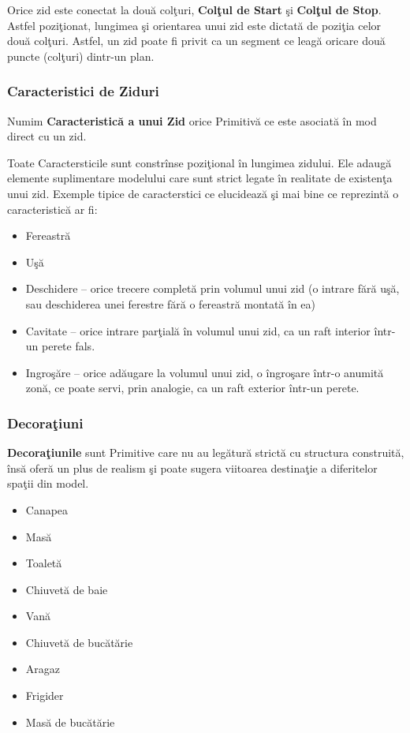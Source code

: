 Orice zid este conectat la două colţuri, \textbf{Colţul de Start} şi 
\textbf{Colţul de Stop}. Astfel poziţionat, lungimea şi orientarea unui zid 
este dictată de poziţia celor două colţuri. Astfel, un zid poate fi privit ca 
un segment ce leagă oricare două puncte (colţuri) dintr-un plan.

\subsubsection{Caracteristici de Ziduri}

\begin{definition}
\label{define:feature}
Numim \textbf{Caracteristică a unui Zid} orice Primitivă ce este asociată în 
mod direct cu un zid.
\end{definition}

Toate Caractersticile sunt constrînse poziţional în lungimea zidului. Ele 
adaugă elemente suplimentare modelului care sunt strict legate în realitate de 
existenţa unui zid. Exemple tipice de caracterstici ce elucidează şi mai bine 
ce reprezintă o caracteristică ar fi:

\begin{itemize}
  \item Fereastră
  \item Uşă
  \item Deschidere -- orice trecere completă prin volumul unui zid (o intrare 
  fără uşă, sau deschiderea unei ferestre fără o fereastră montată în ea)
  \item Cavitate -- orice intrare parţială în volumul unui zid, ca un raft 
  interior într-un perete fals.
  \item Ingroşăre -- orice adăugare la volumul unui zid, o îngroşare într-o 
  anumită zonă, ce poate servi, prin analogie, ca un raft exterior într-un 
  perete.
\end{itemize}
  
\subsubsection{Decoraţiuni}
  
\begin{definition}
\label{define:decoration}
\textbf{Decoraţiunile} sunt Primitive care nu au legătură strictă cu structura 
construită, însă oferă un plus de realism şi poate sugera viitoarea destinaţie 
a diferitelor spaţii din model.
\end{definition}
  
\begin{itemize}
  \item Canapea
  \item Masă
  \item Toaletă
  \item Chiuvetă de baie
  \item Vană
  \item Chiuvetă de bucătărie
  \item Aragaz
  \item Frigider
  \item Masă de bucătărie
\end{itemize}


